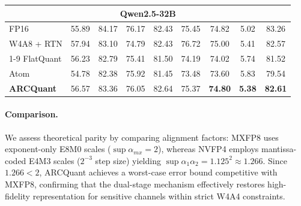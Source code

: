 \documentclass[11pt]{article}
\begin{document}
\begin{table}[t]
\begin{tabular}{l|cccccc|c|c}
\midrule \midrule

\multicolumn{9}{c}{\textbf{Qwen2.5-32B}} \\
\midrule
FP16 & 55.89 & 84.17 & 76.17 & 82.43 & 75.45 & 74.82 & 5.02 & 83.26 \\
W4A8 + RTN    & 57.94 & 83.10 & 74.79 & 82.43 & 76.72 & 75.00 & 5.41 & 82.57 \\
\cmidrule(lr){1-9}
FlatQuant & 56.23 & 82.79 & 75.41 & 81.50 & 74.19 & 74.02 & 5.74 & 81.52 \\
Atom      & 54.78 & 82.38 & 75.92 & 81.45 & 73.48 & 73.60 & 5.83 & 79.54 \\
\rowcolor{lightpink} \textbf{ARCQuant} & 56.57 & 83.36 & 76.05 & 82.64 & 75.37 & \textbf{74.80} & \textbf{5.38} & \textbf{82.61} \\
\bottomrule
\end{tabular}
\end{table}

\paragraph{Comparison.} We assess theoretical parity by comparing alignment factors: MXFP8 uses exponent-only E8M0 scales ($\sup \alpha_{mx} = 2$), whereas NVFP4 employs mantissa-coded E4M3 scales ($2^{-3}$ step size) yielding $\sup \alpha_1 \alpha_2 = 1.125^2 \approx 1.266$. Since $1.266 < 2$, ARCQuant achieves a worst-case error bound competitive with MXFP8, confirming that the dual-stage mechanism effectively restores high-fidelity representation for sensitive channels within strict W4A4 constraints.
\end{document}
